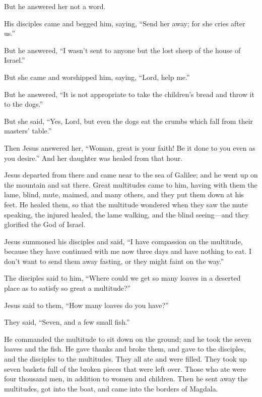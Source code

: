  But he answered her not a word.

His disciples came and begged him, saying, ``Send her away; for she
cries after us.''

 But he answered, ``I wasn't sent to anyone but the lost
sheep of the house of Israel.''

 But she came and worshipped him, saying, ``Lord, help
me.''

 But he answered, ``It is not appropriate to take the
children's bread and throw it to the dogs.''

 But she said, ``Yes, Lord, but even the dogs eat the
crumbs which fall from their masters' table.''

 Then Jesus answered her, ``Woman, great is your faith! Be
it done to you even as you desire.'' And her daughter was healed from
that hour.

 Jesus departed from there and came near to the sea of
Galilee; and he went up on the mountain and sat there. 
Great multitudes came to him, having with them the lame, blind, mute,
maimed, and many others, and they put them down at his feet. He healed
them,  so that the multitude wondered when they saw the
mute speaking, the injured healed, the lame walking, and the blind
seeing---and they glorified the God of Israel.

 Jesus summoned his disciples and said, ``I have compassion
on the multitude, because they have continued with me now three days and
have nothing to eat. I don't want to send them away fasting, or they
might faint on the way.''

 The disciples said to him, ``Where could we get so many
loaves in a deserted place as to satisfy so great a multitude?''

 Jesus said to them, ``How many loaves do you have?''

They said, ``Seven, and a few small fish.''

 He commanded the multitude to sit down on the ground;
 and he took the seven loaves and the fish. He gave thanks
and broke them, and gave to the disciples, and the disciples to the
multitudes.  They all ate and were filled. They took up
seven baskets full of the broken pieces that were left over.
 Those who ate were four thousand men, in addition to women
and children.  Then he sent away the multitudes, got into
the boat, and came into the borders of Magdala.

